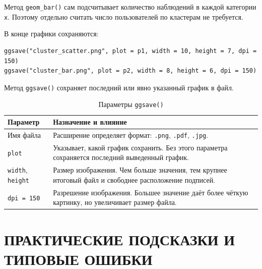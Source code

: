 \documentclass[14pt,a4paper]{extarticle}
\begin{document}
Метод \texttt{geom\_bar()} сам подсчитывает количество наблюдений в каждой категории \texttt{x}. Поэтому отдельно считать число пользователей по кластерам не требуется.

В конце графики сохраняются:

\begin{lstlisting}
ggsave("cluster_scatter.png", plot = p1, width = 10, height = 7, dpi = 150)
ggsave("cluster_bar.png", plot = p2, width = 8, height = 6, dpi = 150)
\end{lstlisting}

Метод \texttt{ggsave()} сохраняет последний или явно указанный график в файл.

\begin{table}[H]
\caption{Параметры \texttt{ggsave()}}
\begin{tabularx}{\textwidth}{|l|Y|}
\hline
\textbf{Параметр} & \textbf{Назначение и влияние} \\
\hline
Имя файла & Расширение определяет формат: \texttt{.png}, \texttt{.pdf}, \texttt{.jpg}. \\
\hline
\texttt{plot} & Указывает, какой график сохранить. Без этого параметра сохраняется последний выведенный график. \\
\hline
\texttt{width}, \texttt{height} & Размер изображения. Чем больше значения, тем крупнее итоговый файл и свободнее расположение подписей. \\
\hline
\texttt{dpi = 150} & Разрешение изображения. Большее значение даёт более чёткую картинку, но увеличивает размер файла. \\
\hline
\end{tabularx}
\end{table}

\newpage

\section{ПРАКТИЧЕСКИЕ ПОДСКАЗКИ И ТИПОВЫЕ ОШИБКИ}
\end{document}
